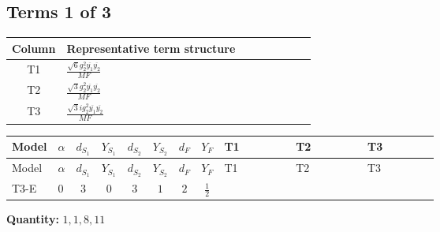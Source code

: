 \documentclass[8pt]{article}
\begin{document}
\begin{landscape}
\subsection*{Terms 1 of 3}
\begin{center}
\begin{tabular}{@{}c >{\raggedright\arraybackslash}p{0.82\linewidth}@{}}
\toprule
Column & Representative term structure \\
\midrule
T1 & \(\displaystyle \frac{\sqrt{6} g_{2}^{2} \overline{y_{1}} \overline{y_{2}}}{MF}\) \\
\midrule
T2 & \(\displaystyle \frac{\sqrt{3} g_{2}^{2} \overline{y_{1}} \overline{y_{2}}}{MF}\) \\
\midrule
T3 & \(\displaystyle \frac{\sqrt{3} i g_{2}^{2} \overline{y_{1}} \overline{y_{2}}}{MF}\) \\
\midrule
\bottomrule
\end{tabular}
\end{center}
\smallskip
\tiny
\begin{longtable}{@{}llcccccc >{\raggedright\arraybackslash}p{0.21\linewidth} >{\raggedright\arraybackslash}p{0.21\linewidth} >{\raggedright\arraybackslash}p{0.21\linewidth}@{}}
\toprule
Model & $\alpha$ & $d_{S_1}$ & $Y_{S_1}$ & $d_{S_2}$ & $Y_{S_2}$ & $d_F$ & $Y_F$ & T1 & T2 & T3 \\
\midrule
\endfirsthead
\toprule
Model & $\alpha$ & $d_{S_1}$ & $Y_{S_1}$ & $d_{S_2}$ & $Y_{S_2}$ & $d_F$ & $Y_F$ & T1 & T2 & T3 \\
\midrule
\endhead
T3-E & $0$ & $3$ & $0$ & $3$ & $1$ & $2$ & $\frac{1}{2}$ & \scriptsize\adjustbox{max width=\linewidth}{$\begin{gathered} \frac{\sqrt{6} g_{2}^{2} \overline{y_{1}} \overline{y_{2}}}{3 MF}\end{gathered}$} & \scriptsize\adjustbox{max width=\linewidth}{$\begin{gathered} \frac{\sqrt{3} g_{2}^{2} \overline{y_{1}} \overline{y_{2}}}{6 MF}\end{gathered}$} & \scriptsize\adjustbox{max width=\linewidth}{$\begin{gathered} - \frac{49 \sqrt{3} i g_{2}^{2} \overline{y_{1}} \overline{y_{2}}}{24 MF}\end{gathered}$} \\
\midrule
\bottomrule
\end{longtable}
\clearpage
\noindent\textbf{Quantity: }$\mathrm{1,1,8,11}$\par\smallskip

\end{landscape}
\end{document}

